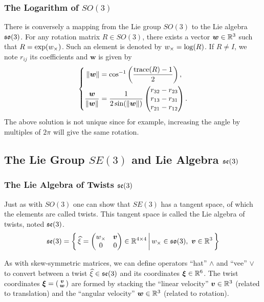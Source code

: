 \subsubsection{The Logarithm of $SO(3)$}%
\label{ssub:the_logarithm_of_so_3_}

There is conversely a mapping from the Lie group $SO(3)$ to the Lie algebra $\mathfrak{so}(3)$.
For any rotation matrix $R \in SO(3)$, there exists a vector $\bm{w} \in \mathbb{R}^3$
such that $R = \exp({w}_{\times})$. Such an element is denoted by
${w}_{\times} = \log(R)$. If $R \ne I$, we note $r_{ij}$ its coefficients
and $\bm{w}$ is given by
\[\left\{ \begin{aligned}
	\|\bm{w}\| &= \cos^{-1}\left(\frac{\text{trace}(R)-1}{2}\right),\\
	\frac{\bm{w}}{\|\bm{w}\|} &= \frac{1}{2\sin(\|\bm{w}\|)}
		\begin{pmatrix}
			r_{32} - r_{23} \\
			r_{13} - r_{31} \\
			r_{21} - r_{12} \\
		\end{pmatrix}.
\end{aligned}\right.\]
The above solution is not unique since for example,
increasing the angle by multiples of $2\pi$ will give the same rotation.


\subsection{The Lie Group $SE(3)$ and Lie Algebra $\mathfrak{se}(3)$}%
\label{sub:the_lie_group_se_3}


\subsubsection{The Lie Algebra of Twists $\mathfrak{se}(3)$}%
\label{ssub:the_lie_algebra_of_twists}

Just as with $SO(3)$ one can show that $SE(3)$
has a tangent space, of which the elements are called twists.
This tangent space is called the Lie algebra of twists, noted $\mathfrak{se}(3)$.
\[
	\seee = \Set%
	{\twist{\xi} = \begin{pmatrix}\cross{w} & \bm{v} \\0 & 0 \end{pmatrix} \in \RR{4}{4}}
	{\cross{w} \in \sooo,\ \bm{v} \in \R^3}
\]

As with skew-symmetric matrices,
we can define operators ``hat'' $\wedge$ and ``vee'' $\vee$ to convert between
a twist $\widehat{\xi} \in \mathfrak{se}(3)$ and its coordinates $\bm{\xi} \in \mathbb{R}^6$.
The twist coordinates $\bm{\xi} = \left(\begin{smallmatrix} \bm{v} \\ \bm{w} \end{smallmatrix} \right)$
are formed by stacking
the ``linear velocity'' $\bm{v} \in \mathbb{R}^3$ (related to translation)
and the ``angular velocity'' $\bm{w} \in \mathbb{R}^3$ (related to rotation).


